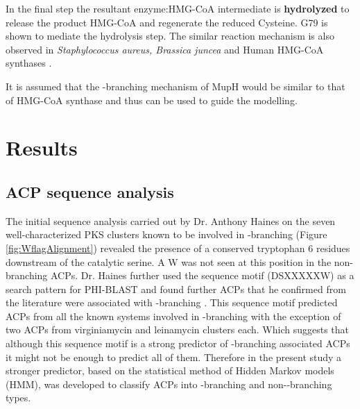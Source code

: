 		In the final step the resultant enzyme:HMG-CoA intermediate is \textbf{hydrolyzed} to release the product HMG-CoA and regenerate the reduced Cysteine. G79 is shown to mediate the hydrolysis step. The similar reaction mechanism is also observed in \textit{Staphylococcus aureus, Brassica juncea} and Human HMG-CoA synthases \parencite{Theisen2004, Shafqat2010}.
		
		It is assumed that the \bet-branching mechanism of MupH would be similar to that of HMG-CoA synthase and thus can be used to guide the modelling.

\section{Results}

	\subsection{ACP sequence analysis}
	\label{sec: ACPSequenceAnalysis}
	The initial sequence analysis carried out by Dr. Anthony Haines on the seven well-characterized PKS clusters known to be involved in \bet-branching (Figure \ref{fig:WflagAlignment}) revealed the presence of a conserved tryptophan 6 residues downstream of the catalytic serine. A W was not seen at this position in the non-branching ACPs. Dr. Haines further used the sequence motif (DSXXXXXW) as a search pattern for PHI-BLAST and found further ACPs that he confirmed from the literature were associated with \bet-branching \parencite{Haines2013}. This sequence motif predicted ACPs from all the known systems involved in \bet-branching with the exception of two ACPs from virginiamycin and leinamycin clusters each. Which suggests that although this sequence motif is a strong predictor of \bet-branching associated ACPs it might not be enough to predict all of them. Therefore in the present study a stronger predictor, based on the statistical method of Hidden Markov models (HMM), was developed to classify ACPs into \bet-branching and non-\bet-branching types.
	
